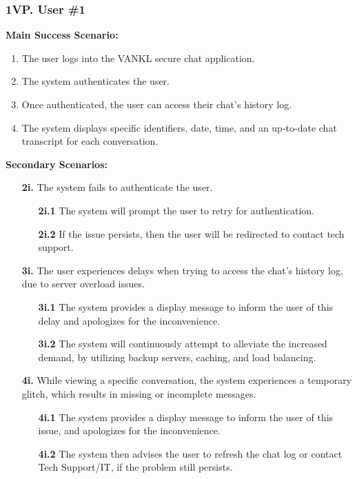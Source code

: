 \documentclass[]{article}
\begin{document}
\subsubsection*{1VP. User \#1}
\textbf{Main Success Scenario:}
\begin{enumerate}
	\item The user logs into the VANKL secure chat application.
	\item The system authenticates the user.
	\item Once authenticated, the user can access their chat’s history log.
	\item The system displays specific identifiers, date, time, and an up-to-date chat transcript for each conversation.
\end{enumerate}
\textbf{Secondary Scenarios:}
\begin{enumerate}
	\item[\textbf{2i.}] The system fails to authenticate the user.
		\begin{enumerate}
			\item[\textbf{2i.1}] The system will prompt the user to retry for authentication.
			\item[\textbf{2i.2}] If the issue persists, then the user will be redirected to contact tech support.
		\end{enumerate}
	\item[\textbf{3i.}] The user experiences delays when trying to access the chat’s history log, due to server overload issues.
		\begin{enumerate}
			\item[\textbf{3i.1}] The system provides a display message to inform the user of this delay and apologizes for the inconvenience.
			\item[\textbf{3i.2}] The system will continuously attempt to alleviate the increased demand, by utilizing backup servers, caching, and load balancing.
		\end{enumerate}
	\item[\textbf{4i.}] While viewing a specific conversation, the system experiences a temporary glitch, which results in missing or incomplete messages.
		\begin{enumerate}
			\item[\textbf{4i.1}] The system provides a display message to inform the user of this issue, and apologizes for the inconvenience.
			\item[\textbf{4i.2}] The system then advises the user to refresh the chat log or contact Tech Support/IT, if the problem still persists.
		\end{enumerate}
\end{enumerate}
\end{document}
